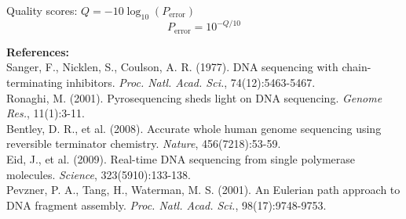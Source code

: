 \begin{technical}
Quality scores: $Q = -10\log_{10}(P_{\text{error}})$
$$
P_{\text{error}} = 10^{-Q/10}
$$

\vspace{0.5em}
\textbf{References:}\\
Sanger, F., Nicklen, S., Coulson, A. R. (1977). DNA sequencing with chain-terminating inhibitors. \textit{Proc. Natl. Acad. Sci.}, 74(12):5463-5467.\\
Ronaghi, M. (2001). Pyrosequencing sheds light on DNA sequencing. \textit{Genome Res.}, 11(1):3-11.\\
Bentley, D. R., et al. (2008). Accurate whole human genome sequencing using reversible terminator chemistry. \textit{Nature}, 456(7218):53-59.\\
Eid, J., et al. (2009). Real-time DNA sequencing from single polymerase molecules. \textit{Science}, 323(5910):133-138.\\
Pevzner, P. A., Tang, H., Waterman, M. S. (2001). An Eulerian path approach to DNA fragment assembly. \textit{Proc. Natl. Acad. Sci.}, 98(17):9748-9753.
\end{technical}
